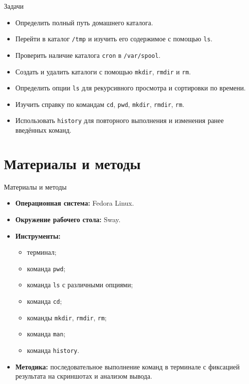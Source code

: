 \documentclass[
  ignorenonframetext,
  aspectratio=169,
  russian,
  aspectratio=169]{beamer}
\providecommand{\tightlist}{%
  \setlength{\itemsep}{0pt}\setlength{\parskip}{0pt}}
\begin{document}
\begin{frame}[fragile]{Задачи}
\protect{}\label{ux437ux430ux434ux430ux447ux438}
\begin{itemize}[<+->]
\tightlist
\item
  Определить полный путь домашнего каталога.
\item
  Перейти в каталог \texttt{/tmp} и изучить его содержимое с помощью
  \texttt{ls}.
\item
  Проверить наличие каталога \texttt{cron} в \texttt{/var/spool}.
\item
  Создать и удалить каталоги с помощью \texttt{mkdir}, \texttt{rmdir} и
  \texttt{rm}.
\item
  Определить опции \texttt{ls} для рекурсивного просмотра и сортировки
  по времени.
\item
  Изучить справку по командам \texttt{cd}, \texttt{pwd}, \texttt{mkdir},
  \texttt{rmdir}, \texttt{rm}.
\item
  Использовать \texttt{history} для повторного выполнения и изменения
  ранее введённых команд.
\end{itemize}
\end{frame}

\section{Материалы и
методы}\label{ux43cux430ux442ux435ux440ux438ux430ux43bux44b-ux438-ux43cux435ux442ux43eux434ux44b}

\begin{frame}[fragile]{Материалы и методы}
\protect{}\label{ux43cux430ux442ux435ux440ux438ux430ux43bux44b-ux438-ux43cux435ux442ux43eux434ux44b-1}
\begin{itemize}[<+->]
\tightlist
\item
  \textbf{Операционная система:} Fedora Linux.
\item
  \textbf{Окружение рабочего стола:} Sway.
\item
  \textbf{Инструменты:}

  \begin{itemize}[<+->]
  \tightlist
  \item
    терминал;
  \item
    команда \texttt{pwd};
  \item
    команда \texttt{ls} с различными опциями;
  \item
    команда \texttt{cd};
  \item
    команды \texttt{mkdir}, \texttt{rmdir}, \texttt{rm};
  \item
    команда \texttt{man};
  \item
    команда \texttt{history}.
  \end{itemize}
\item
  \textbf{Методика:} последовательное выполнение команд в терминале с
  фиксацией результата на скриншотах и анализом вывода.
\end{itemize}
\end{frame}
\end{document}
